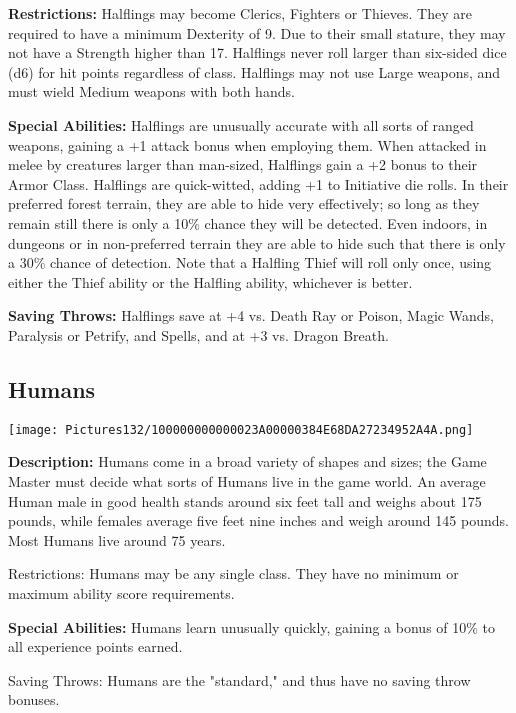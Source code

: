 \documentclass[a4paper,twoside,openany,10pt]{book}
\begin{document}
\begin{multicols}{2}
\textbf{Restrictions: } Halflings may become Clerics, Fighters or Thieves. They are required to have a minimum Dexterity of 9. Due to their small stature, they may not have a Strength higher than 17. Halflings never roll larger than six-sided dice (d6) for hit points regardless of class. Halflings may not use Large weapons, and must wield Medium weapons with both hands.

\textbf{Special Abilities:} Halflings are unusually accurate with all sorts of ranged weapons, gaining a +1 attack bonus when employing them. When attacked in melee by creatures larger than man-sized, Halflings gain a +2 bonus to their Armor Class. Halflings are quick-witted, adding +1 to Initiative die rolls. In their preferred forest terrain, they are able to hide very effectively; so long as they remain still there is only a 10\% chance they will be detected. Even indoors, in dungeons or in non-preferred terrain they are able to hide such that there is only a 30\% chance of detection. Note that a Halfling Thief will roll only once, using either the Thief ability or the Halfling ability, whichever is better.

\textbf{Saving Throws:} Halflings save at +4 vs. Death Ray or Poison, Magic Wands, Paralysis or Petrify, and Spells, and at +3 vs. Dragon Breath.

\subsection{Humans}\label{humans}

\begin{center}
	\texttt{[image: Pictures132/100000000000023A00000384E68DA27234952A4A.png]}
\end{center}\medskip

\textbf{Description:} Humans come in a broad variety of shapes and sizes; the Game Master must decide what sorts of Humans live in the game world. An average Human male in good health stands around six feet tall and weighs about 175 pounds, while females average five feet nine inches and weigh around 145 pounds. Most Humans live around 75 years.

Restrictions: Humans may be any single class. They have no minimum or maximum ability score requirements.

\textbf{Special Abilities:} Humans learn unusually quickly, gaining a bonus of 10\% to all experience points earned.

Saving Throws: Humans are the "standard," and thus have no saving throw bonuses.



\end{multicols}
\end{document}

